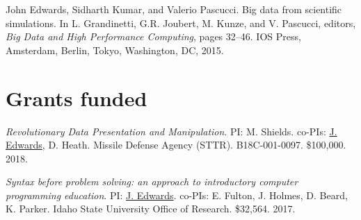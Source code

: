 \documentclass[margin,line]{res}
\begin{document}
\begin{resume}
John Edwards, Sidharth Kumar, and Valerio Pascucci. Big data from scientific simulations. In L. Grandinetti, G.R. Joubert, M. Kunze, and V. Pascucci, editors, \textit{Big Data and High Performance Computing}, pages 32--46. IOS Press, Amsterdam, Berlin, Tokyo, Washington, DC, 2015.

%




\section{\sc Grants funded}
\textit{Revolutionary Data Presentation and Manipulation}. PI: M. Shields. co-PIs: \underline{J. Edwards}, D. Heath. Missile Defense Agency (STTR). B18C-001-0097. \$100,000. 2018.

\textit{Syntax before problem solving: an approach to introductory computer programming education}. PI: \underline{J. Edwards}. co-PIs: E. Fulton, J. Holmes, D. Beard, K. Parker. Idaho State University Office of Research. \$32,564. 2017.


\end{resume}
\end{document}
